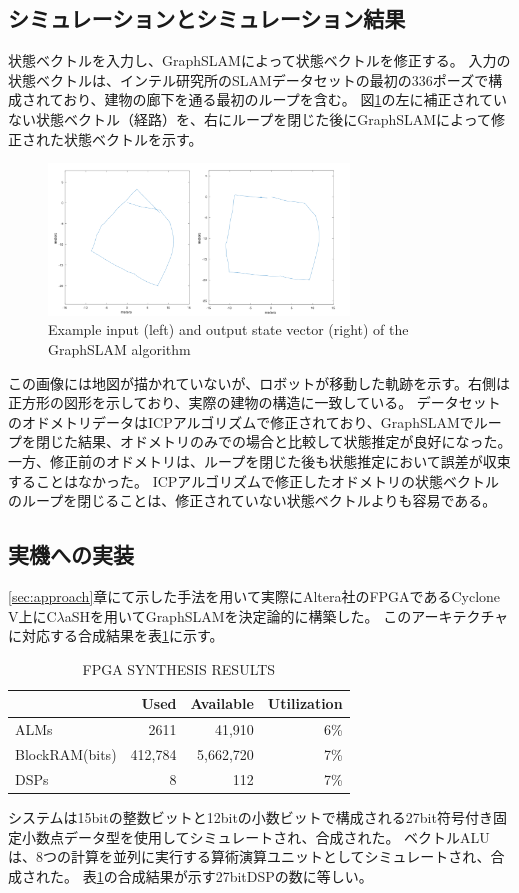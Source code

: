 \documentclass{jsarticle}
\begin{document}
\subsection{シミュレーションとシミュレーション結果}
状態ベクトルを入力し、GraphSLAMによって状態ベクトルを修正する。
入力の状態ベクトルは、インテル研究所のSLAMデータセットの最初の336ポーズで構成されており、建物の廊下を通る最初のループを含む。
図\ref{fig:sim-in-and-out}の左に補正されていない状態ベクトル（経路）を、右にループを閉じた後にGraphSLAMによって修正された状態ベクトルを示す。
\begin{figure}[H]
    \centering
    \includegraphics[width=8cm]{./images/example_input_and_output.png}
    \caption{Example input (left) and output state vector (right) of the GraphSLAM algorithm}\label{fig:sim-in-and-out}
\end{figure}
この画像には地図が描かれていないが、ロボットが移動した軌跡を示す。右側は正方形の図形を示しており、実際の建物の構造に一致している。
データセットのオドメトリデータはICPアルゴリズムで修正されており、GraphSLAMでループを閉じた結果、オドメトリのみでの場合と比較して状態推定が良好になった。
一方、修正前のオドメトリは、ループを閉じた後も状態推定において誤差が収束することはなかった。
ICPアルゴリズムで修正したオドメトリの状態ベクトルのループを閉じることは、修正されていない状態ベクトルよりも容易である。

\subsection{実機への実装}
\ref{sec:approach}章にて示した手法を用いて実際にAltera社のFPGAであるCyclone V上にC$\lambda$aSHを用いてGraphSLAMを決定論的に構築した。
このアーキテクチャに対応する合成結果を表\ref{tab:fpga-results}に示す。
\begin{table}[H]
\caption{FPGA SYNTHESIS RESULTS}
\begin{tabular}{|l|r|r|r|}
\hline
               & Used    & Available & Utilization \\ \hline
ALMs           & 2611    & 41,910    & 6\%         \\
BlockRAM(bits) & 412,784 & 5,662,720 & 7\%         \\
DSPs           & 8       & 112       & 7\%         \\ \hline
\end{tabular}
\label{tab:fpga-results}
\end{table}
システムは15bitの整数ビットと12bitの小数ビットで構成される27bit符号付き固定小数点データ型を使用してシミュレートされ、合成された。
ベクトルALUは、8つの計算を並列に実行する算術演算ユニットとしてシミュレートされ、合成された。
表\ref{tab:fpga-results}の合成結果が示す27bitDSPの数に等しい。
\end{document}
